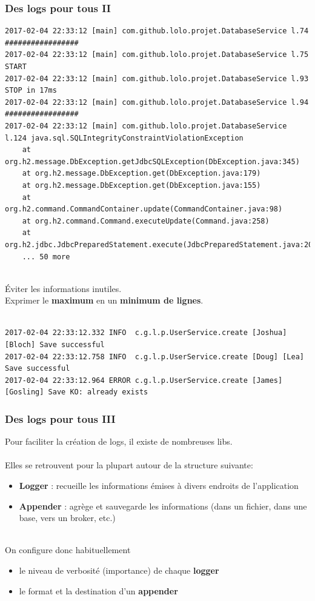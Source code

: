 \begin{frame}[fragile]
	\frametitle{Des logs pour tous II}

    \begin{lstlisting}[basicstyle=\tiny]
2017-02-04 22:33:12 [main] com.github.lolo.projet.DatabaseService l.74 #################
2017-02-04 22:33:12 [main] com.github.lolo.projet.DatabaseService l.75 START
2017-02-04 22:33:12 [main] com.github.lolo.projet.DatabaseService l.93 STOP in 17ms
2017-02-04 22:33:12 [main] com.github.lolo.projet.DatabaseService l.94 #################
2017-02-04 22:33:12 [main] com.github.lolo.projet.DatabaseService l.124 java.sql.SQLIntegrityConstraintViolationException
	at org.h2.message.DbException.getJdbcSQLException(DbException.java:345)
	at org.h2.message.DbException.get(DbException.java:179)
	at org.h2.message.DbException.get(DbException.java:155)
	at org.h2.command.CommandContainer.update(CommandContainer.java:98)
	at org.h2.command.Command.executeUpdate(Command.java:258)
	at org.h2.jdbc.JdbcPreparedStatement.execute(JdbcPreparedStatement.java:201)
	... 50 more
    \end{lstlisting}
    ~\\
    \'{E}viter les informations inutiles.\\
    Exprimer le \textbf{maximum} en un \textbf{minimum de lignes}.
    \\~\\
    \begin{lstlisting}[basicstyle=\tiny]
2017-02-04 22:33:12.332 INFO  c.g.l.p.UserService.create [Joshua] [Bloch] Save successful
2017-02-04 22:33:12.758 INFO  c.g.l.p.UserService.create [Doug] [Lea] Save successful
2017-02-04 22:33:12.964 ERROR c.g.l.p.UserService.create [James] [Gosling] Save KO: already exists
    \end{lstlisting}
\end{frame}

\begin{frame}[fragile]
	\frametitle{Des logs pour tous III}

    Pour faciliter la cr\'{e}ation de logs, il existe de nombreuses libs.
    \\~\\
    Elles se retrouvent pour la plupart autour de la structure suivante:
     \begin{itemize}
    	\item \textbf{Logger} : recueille les informations \'{e}mises \`{a} divers endroits de l'application
        \item \textbf{Appender} : agr\`{e}ge et sauvegarde les informations (dans un fichier, dans une base, vers un broker, etc.)
    \end{itemize}
    ~\\
    On configure donc habituellement
    \begin{itemize}
    	\item le niveau de verbosit\'{e} (importance) de chaque \textbf{logger}
        \item le format et la destination d'un \textbf{appender}
    \end{itemize}
    
\end{frame}

